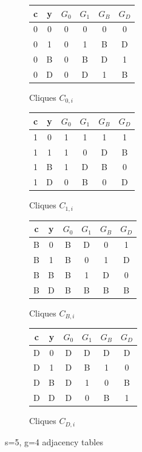 \documentclass[11pt, oneside]{article} 	%
\begin{document}
\begin{figure}[!htb]
\begin{subfigure}{.25\textwidth}
\begin{tabular}{|| c c || c c c c || } 
 \hline
c & y & $G_0$ & $G_1$ & $G_B$ & $G_D$ \\ [0.5ex] 
 \hline\hline
  0 & 0 & 0 & 0 & 0 & 0 \\
  0 & 1 & 0 & 1 & B & D \\
  0 & B & 0 & B & D & 1 \\
  0 & D & 0 & D & 1 & B \\
 \hline
 \end{tabular}
\caption{Cliques $C_{0,i}$}
\label{fig:cliques4-0}
\end{subfigure}
\begin{subfigure}{.25\textwidth}
\begin{tabular}{|| c c || c c c c || } 
 \hline
c & y & $G_0$ & $G_1$ & $G_B$ & $G_D$ \\ [0.5ex] 
 \hline\hline
  1 & 0 & 1 & 1 & 1 & 1 \\
  1 & 1 & 1 & 0 & D & B \\
  1 & B & 1 & D & B & 0 \\
  1 & D & 0 & B & 0 & D \\
  \hline
  
  \end{tabular}
\caption{Cliques $C_{1,i}$}
\label{fig:cliques4-1}
\end{subfigure}
\begin{subfigure}{.25\textwidth}
\begin{tabular}{|| c c || c c c c || } 
 \hline
c & y & $G_0$ & $G_1$ & $G_B$ & $G_D$ \\ [0.5ex] 
 \hline\hline
  \cellcolor{yellow}B & \cellcolor{yellow}0 & \cellcolor{yellow}B & \cellcolor{yellow}D & \cellcolor{yellow}0 & \cellcolor{yellow}1 \\
  \cellcolor{cyan}B & \cellcolor{cyan}1 & \cellcolor{cyan} B & \cellcolor{cyan}0 & \cellcolor{cyan}1 & \cellcolor{cyan} D \\
  B & B & B & 1 & D & 0 \\
  B & D & B & B & B & B \\
  \hline
 
  \end{tabular}
\caption{Cliques $C_{B,i}$}
\label{fig:cliques4-B}
\end{subfigure}
\begin{subfigure}{.25\textwidth}
\begin{tabular}{|| c c || c c c c || } 
 \hline
c & y & $G_0$ & $G_1$ & $G_B$ & $G_D$ \\ [0.5ex] 
 \hline\hline
  D & 0 & D & D & D & D \\
  D & 1 & D & B & 1 & 0 \\
  D & B & D & 1 & 0 & B \\
  D & D & D & 0 & B & 1 \\
  \hline
  
  \end{tabular}
\caption{Cliques $C_{D,i}$}
\label{fig:cliques4-D}
\end{subfigure}
\caption{s=5, g=4 adjacency tables}
\end{figure}
\end{document}
